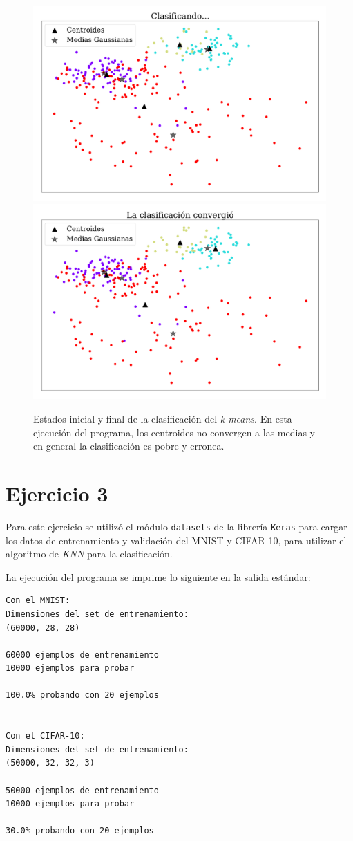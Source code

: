     \begin{figure}[H]
        \centering
        \includegraphics[width=0.5\linewidth]{plots/ejer_2_clasificando.pdf}%
        \hfill
        \includegraphics[width=0.5\linewidth]{plots/ejer_2_no_converge.pdf}
        \caption{Estados inicial y final de la clasificación  del \emph{k-means}. En esta ejecución del programa, los centroides no convergen a las medias y en general la clasificación  es pobre y erronea.}
        \label{fig:ejer2_no_converge}
    \end{figure}

   \section*{Ejercicio 3}

   Para este ejercicio se utilizó el módulo \verb|datasets| de la librería \verb|Keras| para cargar los datos de entrenamiento y validación del MNIST y CIFAR-10, para utilizar el algoritmo de \emph{KNN} para la clasificación.

   La ejecución del programa se imprime lo siguiente  en la salida estándar:

   \begin{verbatim}
Con el MNIST: 
Dimensiones del set de entrenamiento:  
(60000, 28, 28)

60000 ejemplos de entrenamiento
10000 ejemplos para probar

100.0% probando con 20 ejemplos


Con el CIFAR-10: 
Dimensiones del set de entrenamiento:
(50000, 32, 32, 3)

50000 ejemplos de entrenamiento
10000 ejemplos para probar

30.0% probando con 20 ejemplos
   \end{verbatim}


